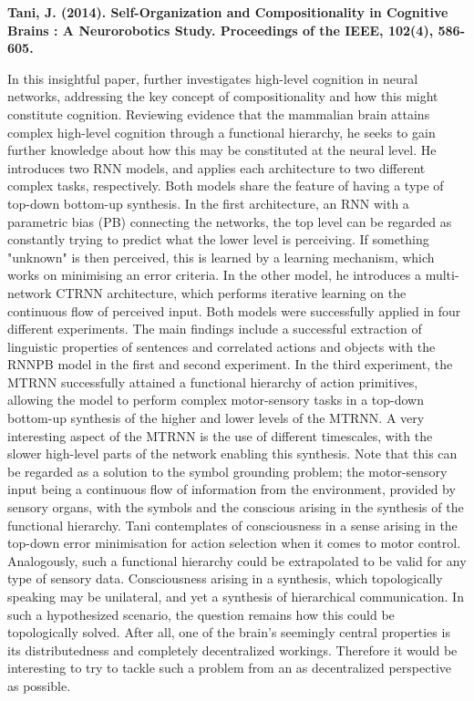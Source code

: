 \textbf{Tani, J. (2014). Self-Organization and Compositionality in Cognitive Brains : A Neurorobotics Study. Proceedings of the IEEE, 102(4), 586-605.}

In this insightful paper, \cite{Tani2014} further investigates high-level cognition in neural networks, addressing the key concept of compositionality and how this might constitute cognition. Reviewing evidence that the mammalian brain attains complex high-level cognition through a functional hierarchy, he seeks to gain further knowledge about how this may be constituted at the neural level. He introduces two RNN models, and applies each architecture to two different complex tasks, respectively. Both models share the feature of having a type of top-down bottom-up synthesis. In the first architecture, an RNN with a parametric bias (PB) connecting the networks, the top level can be regarded as constantly trying to predict what the lower level is perceiving. If something "unknown" is then perceived, this is learned by a learning mechanism, which works on minimising an error criteria. In the other model, he introduces a multi-network CTRNN architecture, which performs iterative learning on the continuous flow of perceived input. Both models were successfully applied in four different experiments. The main findings include a successful extraction of linguistic properties of sentences and correlated actions and objects with the RNNPB model in the first and second experiment. In the third experiment, the MTRNN successfully attained a functional hierarchy of action primitives, allowing the model to perform complex motor-sensory tasks in a top-down bottom-up synthesis of the higher and lower levels of the MTRNN. A very interesting aspect of the MTRNN is the use of different timescales, with the slower high-level parts of the network enabling this synthesis. Note that this can be regarded as a solution to the symbol grounding problem; the motor-sensory input being a continuous flow of information from the environment, provided by sensory organs, with the symbols and the conscious arising in the synthesis of the functional hierarchy. Tani contemplates of consciousness in a sense arising in the top-down error minimisation for action selection when it comes to motor control. Analogously, such a functional hierarchy could be extrapolated to be valid for any type of sensory data. Consciousness arising in a synthesis, which topologically speaking may be unilateral, and yet a synthesis of hierarchical communication. In such a hypothesized scenario, the question remains how this could be topologically solved. After all, one of the brain's seemingly central properties is its distributedness and completely decentralized workings. Therefore it would be interesting to try to tackle such a problem from an as decentralized perspective as possible.


